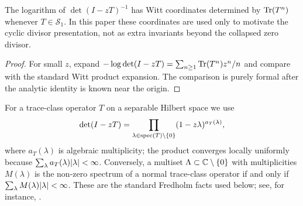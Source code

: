 \begin{proposition}
  \label{prop:fredholm-witt-bridge}
  The logarithm of \(\det(I-zT)^{-1}\) has Witt coordinates determined by
  \(\operatorname{Tr}(T^n)\) whenever \(T\in\mathcal S_1\).  In this paper these coordinates
  are used only to motivate the cyclic divisor presentation, not as extra
  invariants beyond the collapsed zero divisor.
\end{proposition}

\begin{proof}
  For small \(z\), expand
  \(-\log\det(I-zT)=\sum_{n\ge1}\operatorname{Tr}(T^n)z^n/n\) and compare with the standard
  Witt product expansion.  The comparison is purely formal after the analytic
  identity is known near the origin.
\end{proof}

For a trace-class operator \(T\) on a separable Hilbert space we use
\[
  \det(I-zT)=\prod_{\lambda\in\operatorname{spec}(T)\setminus\{0\}}
       (1-z\lambda)^{a_T(\lambda)},
\]
where \(a_T(\lambda)\) is algebraic multiplicity; the product converges
locally uniformly because
\(\sum_{\lambda}a_T(\lambda)\lvert \lambda \rvert<\infty\).  Conversely, a multiset
\(\Lambda\subset\mathbb{C}\setminus\{0\}\) with multiplicities \(M(\lambda)\) is the
non-zero spectrum of a normal trace-class operator if and only if
\(\sum_{\lambda}M(\lambda)\lvert \lambda \rvert<\infty\).  These are the standard Fredholm
facts used below; see, for instance, \cite[Chs.~3--4]{Simon2005TraceIdeals}.

